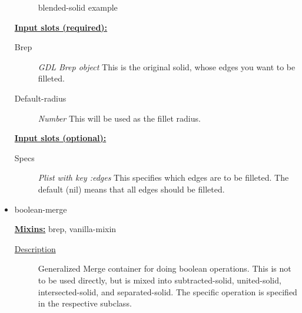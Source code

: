 \documentclass [11pt]{book}
\begin{document}
\begin{itemize}
\begin{figure}
\caption{blended-solid example}

\label{fig:blended-solid}

\end{figure}





\textbf{
\underline{Input slots (required):}}

\begin{description}

\item [Brep]
\emph{GDL Brep object} This is the original solid, whose edges you want to be filleted.


\item [Default-radius]
\emph{Number} This will be used as the fillet radius.


\end{description}






\textbf{
\underline{Input slots (optional):}}

\begin{description}

\item [Specs]
\emph{Plist with key :edges} This specifies which edges are to be filleted. The default (nil)
means that all edges should be filleted.


\end{description}







\item {}boolean-merge


\textbf{
\underline{Mixins:}} brep, vanilla-mixin





\begin{description}

\item [
\underline{Description}]


Generalized Merge container for doing boolean operations. This is not to be used directly, but is 
mixed into subtracted-solid, united-solid, intersected-solid, and separated-solid. 
The specific operation is specified in the respective subclass.




\end{description}
\end{itemize}
\end{document}
